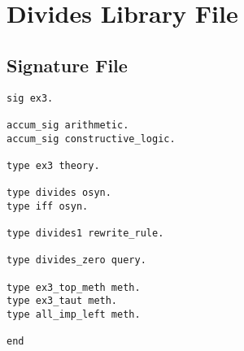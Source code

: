 \section{Divides Library File}
\label{dividestaut}

\subsection{Signature File}
\begin{verbatim}
sig ex3.

accum_sig arithmetic.
accum_sig constructive_logic.

type ex3 theory.

type divides osyn.
type iff osyn.

type divides1 rewrite_rule.

type divides_zero query.

type ex3_top_meth meth.
type ex3_taut meth.
type all_imp_left meth.

end
\end{verbatim}

